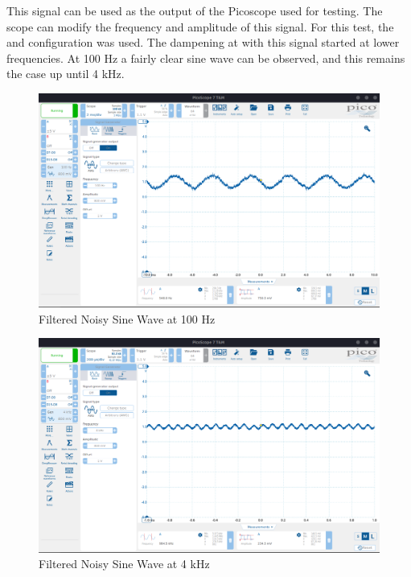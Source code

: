 This signal can be used as the output of the Picoscope used for testing. The scope can modify the frequency and amplitude of this signal. For this test, the  and  configuration was used. The dampening at with this signal started at lower frequencies. At 100 Hz a fairly clear sine wave can be observed, and this remains the case up until 4 kHz.

\begin{figure}[H]
    \centering
    \includegraphics[width=150mm, keepaspectratio]{figures/filter100.png}
    \caption{Filtered Noisy Sine Wave at 100 Hz}
    \label{fig:filter100}
\end{figure}

\begin{figure}[H]
    \centering
    \includegraphics[width=150mm, keepaspectratio]{figures/filter4.png}
    \caption{Filtered Noisy Sine Wave at 4 kHz}
    \label{fig:filter4}
\end{figure}

